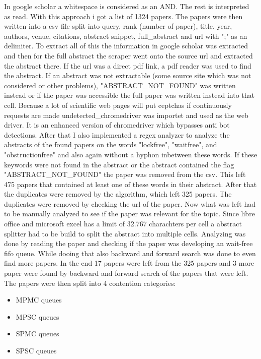 In google scholar a whitespace is considered as an AND. The rest is interpreted as read. With this approach i got a list of 1324 papers. The papers were then written into a csv file split into query, rank (number of paper), title, year, authors, venue, citations, abstract snippet, full\_abstract and url with ";" as an delimiter. To extract all of this the information in google scholar was extracted and then for the full abstract the scraper went onto the source url and extracted the abstract there. If the url was a direct pdf link, a pdf reader was used to find the abstract. If an abstract was not extractable (some source site which was not considered or other problems), "ABSTRACT\_NOT\_FOUND" was written instead or if the paper was accessible the full paper was written instead into that cell. Because a lot of scientific web pages will put ceptchas if continuously requests are made undetected\_chromedriver was importet and used as the web driver. It is an enhanced version of chromedriver which bypasses anti bot detections. After that I also implemented a regex analyzer to analyze the abstracts of the found papers on the words "lock\-free", "wait\-free", and "obstruction\-free" and also again without a hyphon inbetween these words. If these keywords were not found in the abstract or the abstract contained the flag "ABSTRACT\_NOT\_FOUND" the paper was removed from the csv. This left 475 papers that contained at least one of these words in their abstract. After that the duplicates were removed by the algorithm, which left 325 papers. The duplicates were removed by checking the url of the paper. Now what was left had to be manually analyzed to see if the paper was relevant for the topic. Since libre office and microsoft excel has a limit of 32.767 charachters per cell a abstract splitter had to be build to split the abstract into multiple cells. Analyzing was done by reading the paper and checking if the paper was developing an wait-free fifo queue. While dooing that also backward and forward search was done to even find more papers. In the end 17 papers were left from the 325 papers and 3 more paper were found by backward and forward search of the papers that were left. The papers were then split into 4 contention categories:
\begin{itemize}
   \item \ac{MPMC} queues \cite{Kogan2011WaitFreeQueues,FeldmanDechev2015WaitFreeRingBuffer,kogan2012methodology,FeldmanDechevV2,FeldmanDechevV3,RamalheteQueue,wCQWaitFreeQueue,Verma2013Scalable,FastFetchAndAddWaitFreeQueue}
   \item \ac{MPSC} queues \cite{WangCacheCoherent,adampsc,jiffy,JayantiLog,Drescher2015GuardedSections}
   \item \ac{SPMC} queues \cite{Mateíspmc}
   \item \ac{SPSC} queues \cite{Lamport1983SPSCCircularBuffer,torquati2010singleproducersingleconsumerqueuessharedcache,Aldinucci2012EfficientSync,Wang2013BQueue,MaffioneCacheAware,ffq}
\end{itemize}
